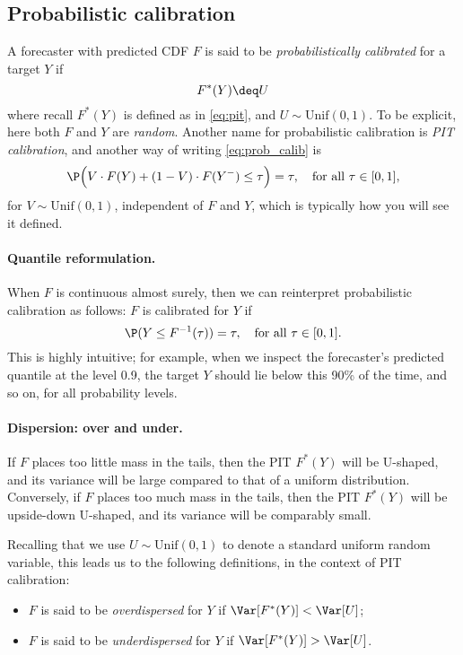 \documentclass{article}
\begin{document}
\subsection{Probabilistic calibration}

A forecaster with predicted CDF $F$ is said to be \emph{probabilistically 
  calibrated} for a target $Y$ if 
\begin{equation}
\label{eq:prob_calib}
F^*(Y) \deq U
\end{equation}
where recall $F^*(Y)$ is defined as in \eqref{eq:pit}, and $U \sim 
\mathrm{Unif}(0,1)$. To be explicit, here both $F$ and $Y$ are
\emph{random}. Another name for probabilistic calibration is \emph{PIT
  calibration}, and another way of writing \eqref{eq:prob_calib} is  
\[
\P\Big( V \cdot F(Y) + (1-V) \cdot F(Y^-) \leq \tau \Big) = \tau, \quad
\text{for all $\tau \in [0,1]$}, 
\]
for $V \sim \mathrm{Unif}(0,1)$, independent of $F$ and $Y$, which is typically
how you will see it defined. 

\paragraph{Quantile reformulation.}

When $F$ is continuous almost surely, then we can reinterpret probabilistic
calibration as follows: $F$ is calibrated for $Y$ if   
\[
\P(Y \leq F^{-1}(\tau)) = \tau, \quad \text{for all $\tau \in [0,1]$}.  
\]
This is highly intuitive; for example, when we inspect the forecaster's
predicted quantile at the level 0.9, the target $Y$ should lie below this 90\% 
of the time, and so on, for all probability levels.   

\paragraph{Dispersion: over and under.}

If $F$ places too little mass in the tails, then the PIT $F^*(Y)$ will be
U-shaped, and its variance will be large compared to that of a uniform
distribution. Conversely, if $F$ places too much mass in the tails, then the PIT
$F^*(Y)$ will be upside-down U-shaped, and its variance will be comparably
small.

Recalling that we use $U \sim \mathrm{Unif}(0,1)$ to denote a standard uniform
random variable, this leads us to the following definitions, in the context of
PIT calibration:    

\begin{itemize}
\item $F$ is said to be \emph{overdispersed} for $Y$ if $\Var[F^*(Y)] < \Var[U]$;
\item $F$ is said to be \emph{underdispersed} for $Y$ if $\Var[F^*(Y)] >
  \Var[U]$. 
\end{itemize}
\end{document}
